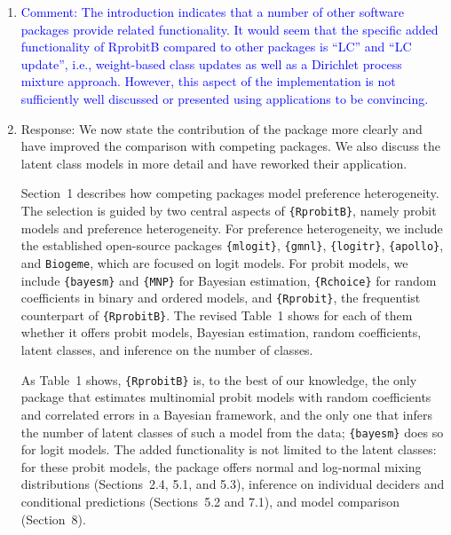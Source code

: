 \documentclass[12pt,a4paper]{article}
\begin{document}
\begin{enumerate}
    \item \textcolor{blue}{Comment: The introduction indicates that a number
    of other software packages provide related functionality. It would seem
    that the specific added functionality of RprobitB compared to other
    packages is ``LC'' and ``LC update'', i.e., weight-based class updates as
    well as a Dirichlet process mixture approach. However, this aspect of the
    implementation is not sufficiently well discussed or presented using
    applications to be convincing.}
    \item[] Response: We now state the contribution of the package more clearly
    and have improved the comparison with competing packages. We also discuss
    the latent class models in more detail and have reworked their application.

    Section~1 describes how competing packages model preference heterogeneity.
    The selection is guided by two central aspects of \texttt{\{RprobitB\}},
    namely probit models and preference heterogeneity. For preference
    heterogeneity, we include the established open-source packages
    \texttt{\{mlogit\}}, \texttt{\{gmnl\}}, \texttt{\{logitr\}},
    \texttt{\{apollo\}}, and \texttt{Biogeme}, which are focused on logit
    models. For probit models, we include \texttt{\{bayesm\}} and
    \texttt{\{MNP\}} for Bayesian estimation, \texttt{\{Rchoice\}} for random
    coefficients in binary and ordered models, and \texttt{\{Rprobit\}}, the
    frequentist counterpart of \texttt{\{RprobitB\}}. The revised Table~1 shows
    for each of them whether it offers probit models, Bayesian estimation,
    random coefficients, latent classes, and inference on the number of
    classes.

    As Table~1 shows, \texttt{\{RprobitB\}} is, to the best of our knowledge,
    the only package that estimates multinomial probit models with random
    coefficients and correlated errors in a Bayesian framework, and the only one
    that infers the number of latent classes of such a model from the data;
    \texttt{\{bayesm\}} does so for logit models. The added functionality is not
    limited to the latent classes: for these probit models, the package offers
    normal and log-normal mixing distributions (Sections~2.4, 5.1, and 5.3),
    inference on individual deciders and conditional predictions (Sections~5.2
    and 7.1), and model comparison (Section~8).


\end{enumerate}
\end{document}
